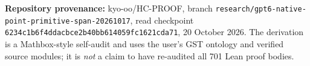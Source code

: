 \documentclass[11pt,a4paper]{article}
\begin{document}
\bigskip\noindent
\textbf{Repository provenance:}
kyo-oo/HC-PROOF, branch
\texttt{research/gpt6-native-point-primitive-span-20261017},
read checkpoint
\texttt{6234c1b6f4ddacbce2b40bb614059fc1621cda71},
20 October 2026.  The derivation is a Mathbox-style
self-audit and uses the user's GST ontology and
verified source modules; it is \emph{not} a claim
to have re-audited all 701 Lean proof bodies.
\end{document}

